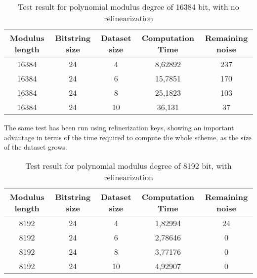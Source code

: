 \documentclass[10pt]{extarticle}
\begin{document}
\begin{table}[!hb]
	\begin{tabular}{||c|c|c|c|c||}
		\hline
		Modulus length & Bitstring size	& Dataset size	& Computation Time	& Remaining noise\\
		\hline\hline
		16384 & 24 & 4 & 8,62892 & 237\\
		\hline
		16384 & 24 & 6 & 15,7851 & 170\\
		\hline
		16384 & 24 & 8 & 25,1823 & 103\\
		\hline
		16384 & 24 & 10 & 36,131 & 37\\
		\hline
	\end{tabular}
	\caption{Test result for polynomial modulus degree of 16384 bit, with no relinearization}
\end{table}
The same test has been run using relinerization keys, showing an important advantage in terms of the time required to compute the whole scheme, as the size of the dataset grows:\\
\begin{table}[!ht]
    \begin{tabular}{||c|c|c|c|c||}
    	\hline
        Modulus length & Bitstring size	& Dataset size	& Computation Time	& Remaining noise\\
        \hline\hline
        8192 & 24 & 4 & 1,82994 & 24\\
        \hline
        8192 & 24 & 6 & 2,78646 & 0\\
        \hline
        8192 & 24 & 8 & 3,77176 & 0\\
        \hline
        8192 & 24 & 10 & 4,92907 & 0\\
        \hline
    \end{tabular}
	\caption{Test result for polynomial modulus degree of 8192 bit, with relinearization}
\end{table}
\end{document}
